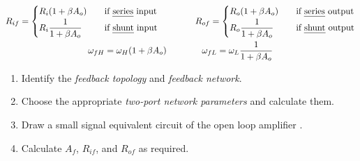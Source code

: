 \begin{CheatsheetEntryFrame}
    \begin{gather*}
        R_{if} =
            \begin{cases}
                \displaystyle R_i (1 + \beta A_o)  & \quad \text{if \emph{series} input} \\
                \displaystyle R_i \frac{\mathstrut 1}{1 + \beta A_o} & \quad \text{if \emph{shunt} input}
            \end{cases}
        \qquad\qquad
        R_{of} =
            \begin{cases}
                \displaystyle R_o (1 + \beta A_o)  & \quad \text{if \emph{series} output} \\
                \displaystyle R_o \frac{\mathstrut 1}{1 + \beta A_o} & \quad \text{if \emph{shunt} output}
            \end{cases}
        \\
        \omega_{fH} = \omega_H (1 + \beta A_o)
        \qquad\qquad
        \omega_{fL} = \omega_L \frac{1}{1 + \beta A_o}
    \end{gather*}

\end{CheatsheetEntryFrame}

\begin{CheatsheetEntryFrame}

    \begin{enumerate}
        \item Identify the \emph{feedback topology} and \emph{feedback network}.
        \item Choose the appropriate \emph{two-port network parameters} and calculate them.
        \item Draw a small signal equivalent circuit of the open loop amplifier .
        \item Calculate $A_f$, $R_{if}$, and $R_{of}$ as required.
    \end{enumerate}

\end{CheatsheetEntryFrame}


